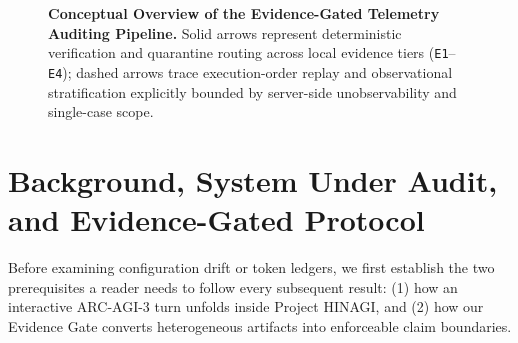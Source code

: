 \documentclass[10pt]{article}
\newcommand{\code}[1]{\texttt{#1}}
\begin{document}
\begin{figure}[t]
{%
}
\caption{\textbf{Conceptual Overview of the Evidence-Gated Telemetry Auditing Pipeline.} Solid arrows represent deterministic verification and quarantine routing across local evidence tiers (\code{E1}--\code{E4}); dashed arrows trace execution-order replay and observational stratification explicitly bounded by server-side unobservability and single-case scope.}
\label{fig:pipeline}
\end{figure}

\section{Background, System Under Audit, and Evidence-Gated Protocol}
\label{sec:background}

Before examining configuration drift or token ledgers, we first establish the two prerequisites a reader needs to follow every subsequent result: (1) how an interactive ARC-AGI-3 turn unfolds inside Project HINAGI, and (2) how our Evidence Gate converts heterogeneous artifacts into enforceable claim boundaries.
\end{document}
